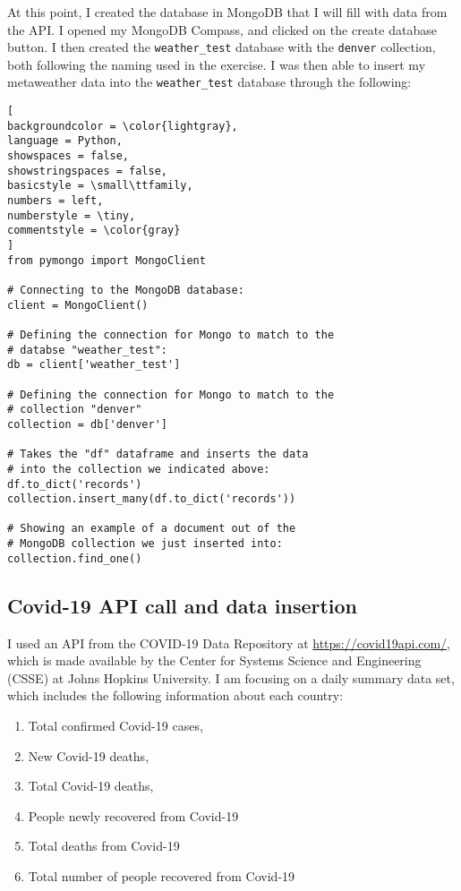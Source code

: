 \documentclass[]{article}
\newcommand{\code}[1]{\colorbox{light-gray}{\texttt{#1}}}
\begin{document}
At this point, I created the database in MongoDB that I will fill with data from the API.  I opened my MongoDB Compass, and clicked on the create database button.  I then created the \code{weather\_test} database with the \code{denver} collection, both following the naming used in the exercise.  I was then able to insert my metaweather data into the \code{weather\_test} database through the following:

\begin{lstlisting}[
backgroundcolor = \color{lightgray},
language = Python,
showspaces = false,
showstringspaces = false,
basicstyle = \small\ttfamily,
numbers = left,
numberstyle = \tiny,
commentstyle = \color{gray}
]
from pymongo import MongoClient

# Connecting to the MongoDB database:
client = MongoClient()

# Defining the connection for Mongo to match to the
# databse "weather_test":
db = client['weather_test']

# Defining the connection for Mongo to match to the
# collection "denver"
collection = db['denver']

# Takes the "df" dataframe and inserts the data
# into the collection we indicated above:
df.to_dict('records')
collection.insert_many(df.to_dict('records'))

# Showing an example of a document out of the
# MongoDB collection we just inserted into:
collection.find_one()
\end{lstlisting}

\subsection{Covid-19 API call and data insertion}
I used an API from the COVID-19 Data Repository at \url{https://covid19api.com/}, which is made available by the Center for Systems Science and Engineering (CSSE) at Johns Hopkins University.  I am focusing on a daily summary data set, which includes the following information about each country: 

\begin{enumerate}
	\item Total confirmed Covid-19 cases,
	\item New Covid-19 deaths,
	\item Total Covid-19 deaths,
	\item People newly recovered from Covid-19
	\item Total deaths from Covid-19
	\item Total number of people recovered from Covid-19
\end{enumerate}
\end{document}
